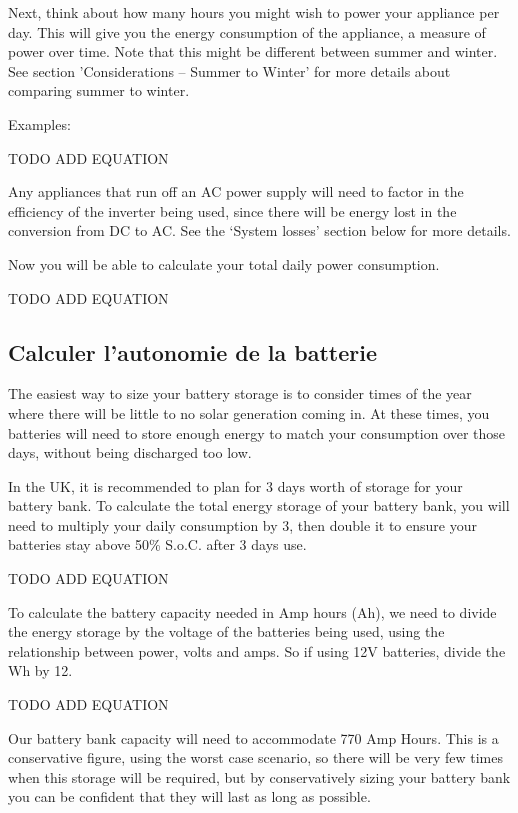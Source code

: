 \documentclass{article}
\theoremstyle{definition}
\theoremstyle{definition}
\theoremstyle{remark}
\begin{document}
    Next, think about how many hours you might wish to power your appliance per day. This will give you the energy consumption of the appliance, a measure of power over time. Note that this might be different between summer and winter. See section 'Considerations – Summer to Winter' for more details about comparing summer to winter.

    Examples:

    TODO ADD EQUATION

    Any appliances that run off an AC power supply will need to factor in the efficiency of the inverter being used, since there will be energy lost in the conversion from DC to AC. See the ‘System losses’ section below for more details.

    Now you will be able to calculate your total daily power consumption.
    
    TODO ADD EQUATION
  

  {\color{blue}\subsection{Calculer l'autonomie de la batterie}} %
  \label{sub:calculer_l_autonomie_de_la_batterie}

    The easiest way to size your battery storage is to consider times of the year where there will be little to no solar generation coming in. At these times, you batteries will need to store enough energy to match your consumption over those days, without being discharged too low.

    In the UK, it is recommended to plan for 3 days worth of storage for your battery bank. To calculate the total energy storage of your battery bank, you will need to multiply your daily consumption by 3, then double it to ensure your batteries stay above 50\% S.o.C. after 3 days use.

    TODO ADD EQUATION

    To calculate the battery capacity needed in Amp hours (Ah), we need to divide the energy storage by the voltage of the batteries being used, using the relationship between power, volts and amps. So if using 12V batteries, divide the Wh by 12.

    TODO ADD EQUATION

    Our battery bank capacity will need to accommodate 770 Amp Hours. This is a conservative figure, using the worst case scenario, so there will be very few times when this storage will be required, but by conservatively sizing your battery bank you can be confident that they will last as long as possible.
\end{document}
